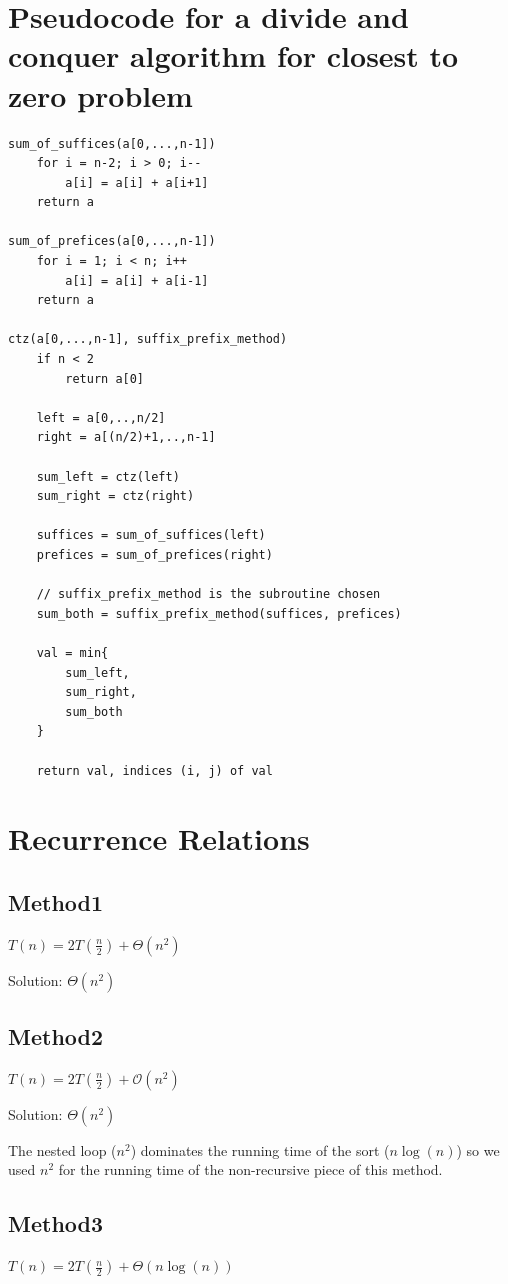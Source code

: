 \documentclass{article}
\begin{document}
\section{Pseudocode for a divide and conquer algorithm for closest to zero problem}
\begin{verbatim}
sum_of_suffices(a[0,...,n-1])
    for i = n-2; i > 0; i--
        a[i] = a[i] + a[i+1]
    return a

sum_of_prefices(a[0,...,n-1])
    for i = 1; i < n; i++
        a[i] = a[i] + a[i-1]
    return a

ctz(a[0,...,n-1], suffix_prefix_method)
    if n < 2
        return a[0]

    left = a[0,..,n/2]
    right = a[(n/2)+1,..,n-1]

    sum_left = ctz(left)
    sum_right = ctz(right)

    suffices = sum_of_suffices(left)
    prefices = sum_of_prefices(right)

    // suffix_prefix_method is the subroutine chosen
    sum_both = suffix_prefix_method(suffices, prefices)

    val = min{
        sum_left,
        sum_right,
        sum_both
    }

    return val, indices (i, j) of val

\end{verbatim}

\section{Recurrence Relations}

\subsection*{Method1}
$T(n) = 2T(\frac{n}{2}) + \Theta(n^2)$

Solution: $\Theta(n^2)$

\subsection*{Method2}
$T(n) = 2T(\frac{n}{2}) + \mathcal{O}(n^2)$

Solution: $\Theta(n^2)$

The nested loop ($n^2$) dominates the running time of the sort ($n \log(n)$) so
we used $n^2$ for the running time of the non-recursive piece of this method.

\subsection*{Method3}
$T(n) = 2T(\frac{n}{2}) + \Theta(n \log(n))$\\
\end{document}
